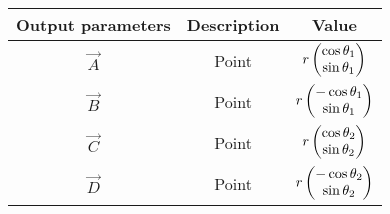     \begin{tabular}{|c|c|c|}
    \hline
    \textbf{Output parameters} &\textbf{Description}&\textbf{Value}  \\
        \hline
         $\vec{A}$&Point&$r\begin{pmatrix}\cos{\theta_1}\\\sin{\theta_1}\end{pmatrix}$\\
         \hline
         $\vec{B}$&Point&$r\begin{pmatrix}-\cos{\theta_1}\\\sin{\theta_1}\end{pmatrix}$\\
         \hline
          $\vec{C}$&Point&$r\begin{pmatrix}\cos{\theta_2}\\\sin{\theta_2}\end{pmatrix}$ \\
         \hline
          $\vec{D}$&Point&$r\begin{pmatrix}-\cos{\theta_2}\\\sin{\theta_2}\end{pmatrix}$ \\
         \hline
    \end{tabular}
